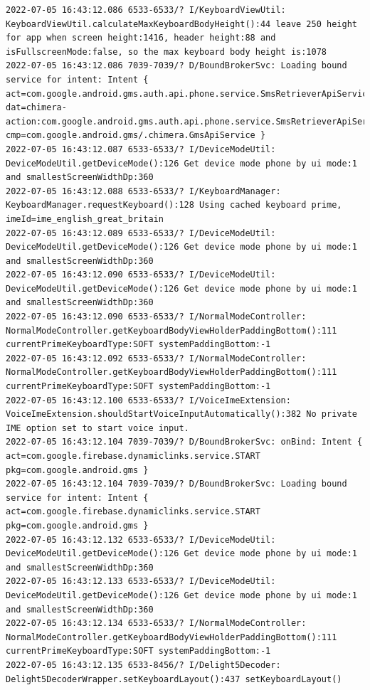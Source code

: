 \documentclass[a4paper,12pt]{book}
\begin{document}
\begin{lstlisting}
2022-07-05 16:43:12.086 6533-6533/? I/KeyboardViewUtil: KeyboardViewUtil.calculateMaxKeyboardBodyHeight():44 leave 250 height for app when screen height:1416, header height:88 and isFullscreenMode:false, so the max keyboard body height is:1078
2022-07-05 16:43:12.086 7039-7039/? D/BoundBrokerSvc: Loading bound service for intent: Intent { act=com.google.android.gms.auth.api.phone.service.SmsRetrieverApiService.START dat=chimera-action:com.google.android.gms.auth.api.phone.service.SmsRetrieverApiService.START cmp=com.google.android.gms/.chimera.GmsApiService }
2022-07-05 16:43:12.087 6533-6533/? I/DeviceModeUtil: DeviceModeUtil.getDeviceMode():126 Get device mode phone by ui mode:1 and smallestScreenWidthDp:360
2022-07-05 16:43:12.088 6533-6533/? I/KeyboardManager: KeyboardManager.requestKeyboard():128 Using cached keyboard prime, imeId=ime_english_great_britain
2022-07-05 16:43:12.089 6533-6533/? I/DeviceModeUtil: DeviceModeUtil.getDeviceMode():126 Get device mode phone by ui mode:1 and smallestScreenWidthDp:360
2022-07-05 16:43:12.090 6533-6533/? I/DeviceModeUtil: DeviceModeUtil.getDeviceMode():126 Get device mode phone by ui mode:1 and smallestScreenWidthDp:360
2022-07-05 16:43:12.090 6533-6533/? I/NormalModeController: NormalModeController.getKeyboardBodyViewHolderPaddingBottom():111 currentPrimeKeyboardType:SOFT systemPaddingBottom:-1
2022-07-05 16:43:12.092 6533-6533/? I/NormalModeController: NormalModeController.getKeyboardBodyViewHolderPaddingBottom():111 currentPrimeKeyboardType:SOFT systemPaddingBottom:-1
2022-07-05 16:43:12.100 6533-6533/? I/VoiceImeExtension: VoiceImeExtension.shouldStartVoiceInputAutomatically():382 No private IME option set to start voice input.
2022-07-05 16:43:12.104 7039-7039/? D/BoundBrokerSvc: onBind: Intent { act=com.google.firebase.dynamiclinks.service.START pkg=com.google.android.gms }
2022-07-05 16:43:12.104 7039-7039/? D/BoundBrokerSvc: Loading bound service for intent: Intent { act=com.google.firebase.dynamiclinks.service.START pkg=com.google.android.gms }
2022-07-05 16:43:12.132 6533-6533/? I/DeviceModeUtil: DeviceModeUtil.getDeviceMode():126 Get device mode phone by ui mode:1 and smallestScreenWidthDp:360
2022-07-05 16:43:12.133 6533-6533/? I/DeviceModeUtil: DeviceModeUtil.getDeviceMode():126 Get device mode phone by ui mode:1 and smallestScreenWidthDp:360
2022-07-05 16:43:12.134 6533-6533/? I/NormalModeController: NormalModeController.getKeyboardBodyViewHolderPaddingBottom():111 currentPrimeKeyboardType:SOFT systemPaddingBottom:-1
2022-07-05 16:43:12.135 6533-8456/? I/Delight5Decoder: Delight5DecoderWrapper.setKeyboardLayout():437 setKeyboardLayout()

\end{lstlisting}
\end{document}
